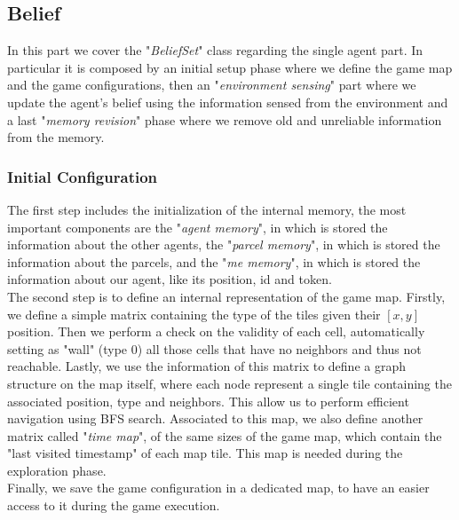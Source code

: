    \subsection{Belief}
        In this part we cover the "\textit{BeliefSet}" class regarding the single agent part. In particular it is composed by an initial setup phase where we define the game map and the game configurations, then an "\textit{environment sensing}" part where we update the agent's belief using the information sensed from the environment and a last "\textit{memory revision}" phase where we remove old and unreliable information from the memory.

        \subsubsection{Initial Configuration}
            The first step includes the initialization of the internal memory, the most important components are the "\textit{agent memory}", in which is stored the information about the other agents, the "\textit{parcel memory}", in which is stored the information about the parcels, and the "\textit{me memory}", in which is stored the information about our agent, like its position, id and token.
            \medskip\\
            The second step is to define an internal representation of the game map. Firstly, we define a simple matrix containing the type of the tiles given their $[x, y]$ position. Then we perform a check on the validity of each cell, automatically setting as "wall" (type $0$) all those cells that have no neighbors and thus not reachable. Lastly, we use the information of this matrix to define a graph structure on the map itself, where each node represent a single tile containing the associated position, type and neighbors. This allow us to perform efficient navigation using BFS search. Associated to this map, we also define another matrix called "\textit{time map}", of the same sizes of the game map, which contain the "last visited timestamp" of each map tile. This map is needed during the exploration phase.
            \medskip\\
            Finally, we save the game configuration in a dedicated map, to have an easier access to it during the game execution.

